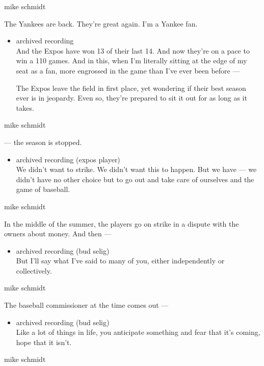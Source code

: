 mike schmidt

The Yankees are back. They're great again. I'm a Yankee fan.

\begin{itemize}
\item
  archived recording\\
  And the Expos have won 13 of their last 14. And now they're on a pace
  to win a 110 games. And in this, when I'm literally sitting at the
  edge of my seat as a fan, more engrossed in the game than I've ever
  been before ---

  The Expos leave the field in first place, yet wondering if their best
  season ever is in jeopardy. Even so, they're prepared to sit it out
  for as long as it takes.
\end{itemize}

mike schmidt

--- the season is stopped.

\begin{itemize}
\tightlist
\item
  archived recording (expos player)\\
  We didn't want to strike. We didn't want this to happen. But we have
  --- we didn't have no other choice but to go out and take care of
  ourselves and the game of baseball.
\end{itemize}

mike schmidt

In the middle of the summer, the players go on strike in a dispute with
the owners about money. And then ---

\begin{itemize}
\tightlist
\item
  archived recording (bud selig)\\
  But I'll say what I've said to many of you, either independently or
  collectively.
\end{itemize}

mike schmidt

The baseball commissioner at the time comes out ---

\begin{itemize}
\tightlist
\item
  archived recording (bud selig)\\
  Like a lot of things in life, you anticipate something and fear that
  it's coming, hope that it isn't.
\end{itemize}

mike schmidt


